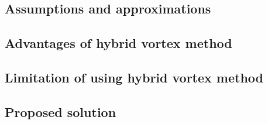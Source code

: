 \subsection{Assumptions and approximations}

\subsection{Advantages of hybrid vortex method}

\subsection{Limitation of using hybrid vortex method}

\subsection{Proposed solution}



%



